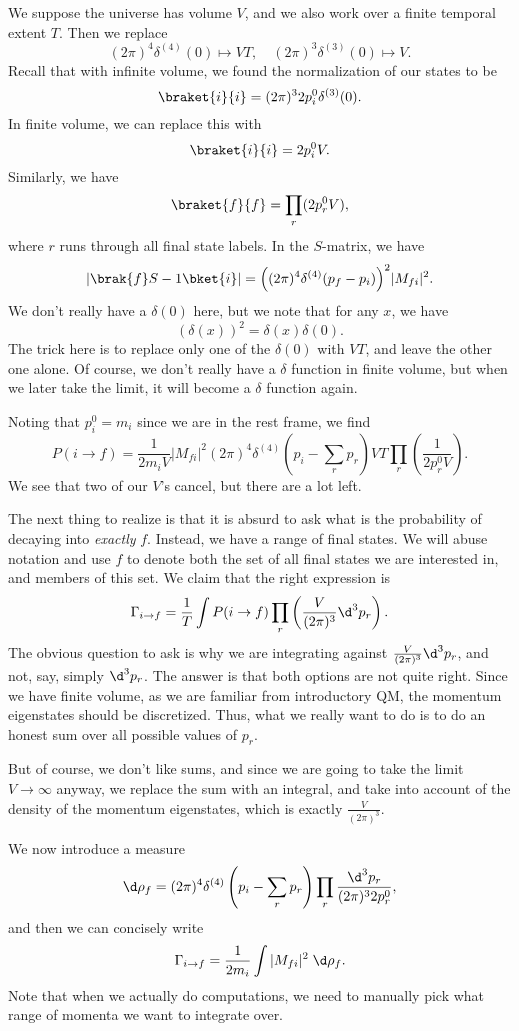 \documentclass[a4paper]{article}
\begin{document}
We suppose the universe has volume $V$, and we also work over a finite temporal extent $T$. Then we replace
\[
  (2\pi)^4 \delta^{(4)}(0) \mapsto VT,\quad (2\pi)^3 \delta^{(3)}(0) \mapsto V.
\]
Recall that with infinite volume, we found the normalization of our states to be
\[
  \braket{i}{i} = (2\pi)^3 2 p_i^0 \delta^{(3)}(0).
\]
In finite volume, we can replace this with
\[
  \braket{i}{i} = 2p_i^0 V.
\]
Similarly, we have
\[
  \braket{f}{f} = \prod_r (2 p_r^0 V),
\]
where $r$ runs through all final state labels. In the $S$-matrix, we have
\[
  |\brak{f}S - 1 \bket{i}| = \Big((2\pi)^4 \delta^{(4)}(p_f - p_i)\Big)^2 |M_{fi}|^2.
\]
We don't really have a $\delta(0)$ here, but we note that for any $x$, we have
\[
  (\delta(x))^2 = \delta(x) \delta(0).
\]
The trick here is to replace only one of the $\delta(0)$ with $VT$, and leave the other one alone. Of course, we don't really have a $\delta$ function in finite volume, but when we later take the limit, it will become a $\delta$ function again.

Noting that $p_i^0 = m_i$ since we are in the rest frame, we find
\[
  P(i \to f) = \frac{1}{2 m_i V}|M_{fi}|^2 (2\pi)^4 \delta^{(4)}\left(p_i - \sum_r p_r\right) VT \prod_r \left(\frac{1}{2 p_r^0 V}\right).
\]
We see that two of our $V$'s cancel, but there are a lot left.

The next thing to realize is that it is absurd to ask what is the probability of decaying into \emph{exactly} $f$. Instead, we have a range of final states. We will abuse notation and use $f$ to denote both the set of all final states we are interested in, and members of this set. We claim that the right expression is
\[
  \Gamma_{i \to f} = \frac{1}{T} \int P(i \to f) \prod_r \left(\frac{V}{(2\pi)^3}\d^3 p_r\right).
\]
The obvious question to ask is why we are integrating against $\frac{V}{(2\pi)^3} \d^3 p_r$, and not, say, simply $\d^3 p_r$. The answer is that both options are not quite right. Since we have finite volume, as we are familiar from introductory QM, the momentum eigenstates should be discretized. Thus, what we really want to do is to do an honest sum over all possible values of $p_r$.

But of course, we don't like sums, and since we are going to take the limit $V \to \infty$ anyway, we replace the sum with an integral, and take into account of the density of the momentum eigenstates, which is exactly $\frac{V}{(2\pi)^3}$.

We now introduce a measure
\[
  \d \rho_f = (2\pi)^4 \delta^{(4)}\left(p_i - \sum_r p_r\right) \prod_r \frac{\d^3 p_r}{(2\pi)^3 2 p_r^0},
\]
and then we can concisely write
\[
  \Gamma_{i \to f} = \frac{1}{2 m_i} \int |M_{fi}|^2 \;\d \rho_f.
\]
Note that when we actually do computations, we need to manually pick what range of momenta we want to integrate over.
\end{document}
